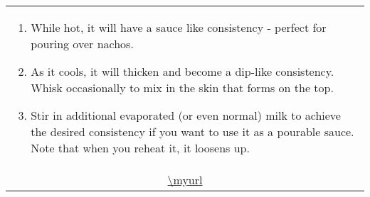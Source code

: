 \documentclass[web-recipes.tex]{subfiles}
\begin{document}
\begin{mdframed}[nobreak]
\begin{tabular}{l}
\begin{minipage}[t]{0.55\textwidth}
\begin{enumerate}
        \item While hot, it will have a sauce like consistency - perfect for
          pouring over nachos.
        \item As it cools, it will thicken and become a dip-like consistency.
          Whisk occasionally to mix in the skin that forms on the top.
        \item Stir in additional evaporated (or even normal) milk to achieve
          the desired consistency if you want to use it as a pourable sauce.
          Note that when you reheat it, it loosens up.
      \end{enumerate}
    \end{minipage} \vspace{3ex}\\
    \multicolumn{1}{c}{\small\ttfamily \url{\myurl}} \\
  \end{tabular}
\end{mdframed}
\end{document}
